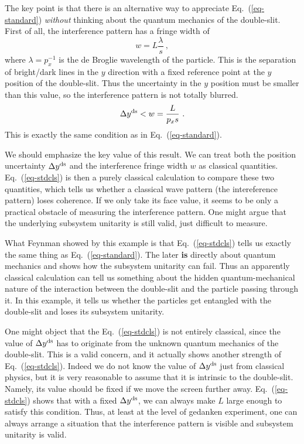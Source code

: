 \documentclass[aps,showpacs,onecolumn,floats,prd,superscriptaddress,nofootinbib]{revtex4-1}
\begin{document}
The key point is that there is an alternative way to appreciate Eq.~(\ref{eq-standard}) {\it without} thinking about the quantum mechanics of the double-slit. 
First of all, the interference pattern has a fringe width of  
\begin{equation}
w = L\frac{\lambda}{s}~,
\end{equation}
where $\lambda = p_x^{-1}$ is the de Broglie wavelength of the particle. This is the separation of bright/dark lines in the $y$ direction with a fixed reference point at the $y$ position of the double-slit. Thus the uncertainty in the $y$ position must be smaller than this value, so the interference pattern is not totally blurred.
\begin{equation}
\Delta y^{\rm ds} < w = \frac{L}{p_xs}~.
\label{eq-stdcls}
\end{equation}
This is exactly the same condition as in Eq.~(\ref{eq-standard}).

We should emphasize the key value of this result. 
We can treat both the position uncertainty $\Delta y^{\rm ds}$ and the interference fringe width $w$ as classical quantities. Eq.~(\ref{eq-stdcls}) is then a purely classical calculation to compare these two quantities, which tells us whether a classical wave pattern (the intereference pattern) loses coherence. 
If we only take its face value, it seems to be only a practical obstacle of measuring the interference pattern. 
One might argue that the underlying subsystem unitarity is still valid, just difficult to measure. 

What Feynman showed by this example is that Eq.~(\ref{eq-stdcls}) tells us exactly the same thing as Eq.~(\ref{eq-standard}). 
The later {\bf is} directly about quantum mechanics and shows how the subsystem unitarity can fail. 
Thus an apparently classical calculation can tell us something about the hidden quantum-mechanical nature of the interaction between the double-slit and the particle passing through it. 
In this example, it tells us whether the particles get entangled with the double-slit and loses its subsystem unitarity. 

One might object that the Eq.~(\ref{eq-stdcls}) is not entirely classical, since the value of $\Delta y^{\rm ds}$ has to originate from the unknown quantum mechanics of the double-slit. 
This is a valid concern, and it actually shows another strength of Eq.~(\ref{eq-stdcls}). 
Indeed we do not know the value of $\Delta y^{\rm ds}$ just from classical physics, but it is very reasonable to assume that it is intrinsic to the double-slit. 
Namely, its value should be fixed if we move the screen further away. Eq.~(\ref{eq-stdcls}) shows that with a fixed $\Delta y^{\rm ds}$, we can always make $L$ large enough to satisfy this condition. 
Thus, at least at the level of gedanken experiment, one can always arrange a situation that the interference pattern is visible and subsystem unitarity is valid.
\end{document}
